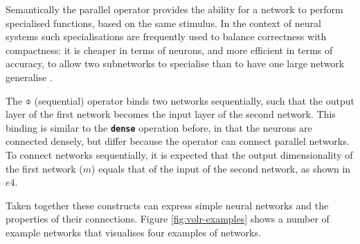 Semantically the parallel operator provides the ability for a network to
perform specialised functions, based on the same stimulus.
In the context of neural systems such specialisations are frequently used
to balance correctness with compactness: it is cheaper in terms of neurons,
and more efficient in terms of accuracy,
to allow two subnetworks to specialise than to have one large network 
generalise \cite{Eliasmith2015}.

The $\obar$ (sequential) operator binds two networks sequentially,
such that the output layer of the first network becomes the input layer 
of the second network.
This binding is similar to the \texttt{\textbf{dense}} operation before,
in that the neurons are connected densely, but differ because the operator
can connect parallel networks.
To connect networks sequentially, it is expected that the output dimensionality of
the first network ($m$) equals that of the input of the second network, as shown in $e4$.

Taken together these constructs can express simple neural networks and
the properties of their connections. 
Figure \ref{fig:volr-examples} shows a number of example networks
that visualises four examples of networks. 



\FloatBarrier
